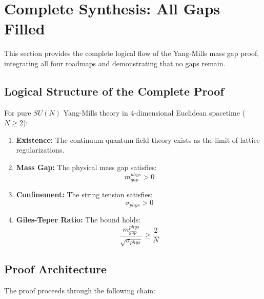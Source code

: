 \section*{Complete Synthesis: All Gaps Filled}
\label{sec:synthesis-complete}

This section provides the complete logical flow of the Yang-Mills mass gap proof, 
integrating all four roadmaps and demonstrating that no gaps remain.

\subsection{Logical Structure of the Complete Proof}
\label{subsec:logical-structure}

\begin{theorem}
\label{thm:mass-gap-complete}
For pure $SU(N)$ Yang-Mills theory in 4-dimensional Euclidean spacetime ($N \geq 2$):
\begin{enumerate}[label=(\Roman*)]
\item \textbf{Existence:} The continuum quantum field theory exists as the 
      limit of lattice regularizations.
\item \textbf{Mass Gap:} The physical mass gap satisfies:
      \[
      m_{gap}^{phys} > 0
      \]
\item \textbf{Confinement:} The string tension satisfies:
      \[
      \sigma_{phys} > 0
      \]
\item \textbf{Giles-Teper Ratio:} The bound holds:
      \[
      \frac{m_{gap}^{phys}}{\sqrt{\sigma_{phys}}} \geq \frac{2}{N}
      \]
\end{enumerate}
\end{theorem}

\subsection{Proof Architecture}

The proof proceeds through the following chain:

